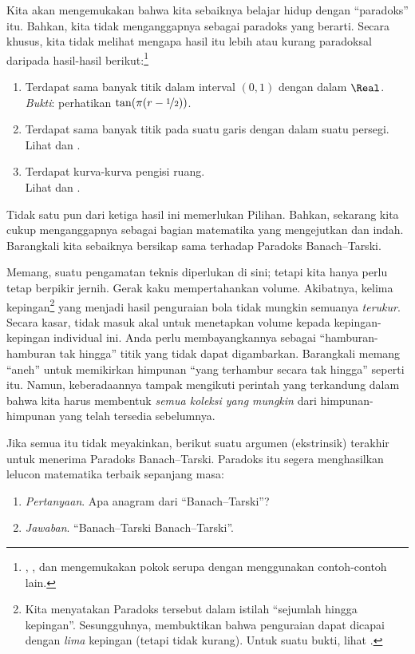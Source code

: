 \documentclass[../../../include/open-logic-section]{subfiles}
\begin{document}
Kita akan mengemukakan bahwa kita sebaiknya belajar hidup dengan
``paradoks'' itu. Bahkan, kita tidak menganggapnya sebagai paradoks yang
berarti. Secara khusus, kita tidak melihat mengapa hasil itu lebih atau
kurang paradoksal daripada hasil-hasil berikut:\footnote{
\citet[hlm.~276--277]{Potter2004}, \citet[hlm.~16]{Weston2003}, dan
\citet[hlm.~31, 308--309]{Wagon2016} mengemukakan pokok serupa dengan
menggunakan contoh-contoh lain.}
\begin{enumerate}
	\item Terdapat sama banyak titik dalam interval $(0,1)$ dengan dalam
	$\Real$.
	\\\emph{Bukti}: perhatikan $\tan(\pi(r-\nicefrac{1}{2}))$.
	\item Terdapat sama banyak titik pada suatu garis dengan dalam suatu
	persegi.
	\\Lihat {} dan
	.
	\item Terdapat kurva-kurva pengisi ruang.
	\\Lihat {} dan
	.
\end{enumerate}
Tidak satu pun dari ketiga hasil ini memerlukan Pilihan. Bahkan, sekarang
kita cukup menganggapnya sebagai bagian matematika yang mengejutkan dan
indah. Barangkali kita sebaiknya bersikap sama terhadap Paradoks
Banach--Tarski.

Memang, suatu pengamatan teknis diperlukan di sini; tetapi kita hanya perlu
tetap berpikir jernih. Gerak kaku mempertahankan volume. Akibatnya, kelima
kepingan\footnote{Kita menyatakan Paradoks tersebut dalam istilah
``sejumlah hingga kepingan''. Sesungguhnya, \citet{Robinson1947}
membuktikan bahwa penguraian dapat dicapai dengan \emph{lima} kepingan
(tetapi tidak kurang). Untuk suatu bukti, lihat
\citet[hlm.~66--67]{Wagon2016}.} yang menjadi hasil penguraian bola tidak
mungkin semuanya \emph{terukur}. Secara kasar, tidak masuk akal untuk
menetapkan volume kepada kepingan-kepingan individual ini. Anda perlu
membayangkannya sebagai ``hamburan-hamburan tak hingga'' titik yang tidak
dapat digambarkan. Barangkali memang ``aneh'' untuk memikirkan himpunan
``yang terhambur secara tak hingga'' seperti itu. Namun, keberadaannya
tampak mengikuti perintah yang terkandung dalam \stagesacc{} bahwa kita
harus membentuk \emph{semua koleksi yang mungkin} dari himpunan-himpunan
yang telah tersedia sebelumnya.

Jika semua itu tidak meyakinkan, berikut suatu argumen (ekstrinsik) terakhir
untuk menerima Paradoks Banach--Tarski. Paradoks itu segera menghasilkan
lelucon matematika terbaik sepanjang masa:
\begin{enumerate}
	\item[] \emph{Pertanyaan}. Apa anagram dari ``Banach--Tarski''?
	\item[] \emph{Jawaban}. ``Banach--Tarski Banach--Tarski''.
\end{enumerate}
\end{document}
